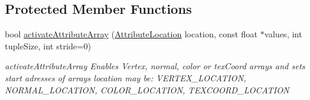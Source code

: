 \subsection*{Protected Member Functions}
\begin{DoxyCompactItemize}
\item 
bool \mbox{\hyperlink{class_g_l_e_s_renderer_ae18e97568cc61118fdcb6f9ca0b6480f}{activate\+Attribute\+Array}} (\mbox{\hyperlink{class_g_l_e_s_renderer_a05f4cf233d5cf60f4d6ea50ddc06a2c4}{Attribute\+Location}} location, const float $\ast$values, int tuple\+Size, int stride=0)
\begin{DoxyCompactList}\small\item\em activate\+Attribute\+Array Enables Vertex, normal, color or tex\+Coord arrays and sets start adresses of arrays location may be\+: V\+E\+R\+T\+E\+X\+\_\+\+L\+O\+C\+A\+T\+I\+ON, N\+O\+R\+M\+A\+L\+\_\+\+L\+O\+C\+A\+T\+I\+ON, C\+O\+L\+O\+R\+\_\+\+L\+O\+C\+A\+T\+I\+ON, T\+E\+X\+C\+O\+O\+R\+D\+\_\+\+L\+O\+C\+A\+T\+I\+ON \end{DoxyCompactList}\end{DoxyCompactItemize}
